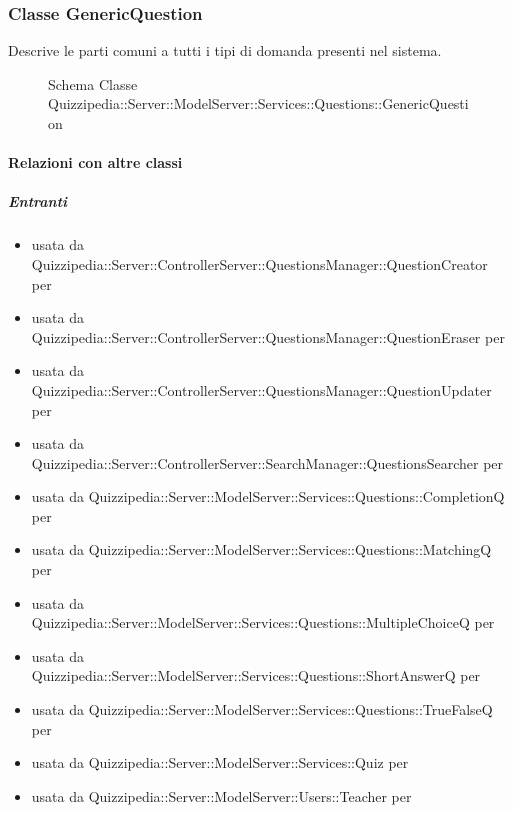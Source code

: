 \subsubsection{Classe GenericQuestion}
Descrive le parti comuni a tutti i tipi di domanda presenti nel sistema.
\begin{figure}[H]
\centering
\noindent{}
\caption[Schema Classe GenericQuestion]{Schema Classe Quizzipedia::Server::ModelServer::Services::Questions::GenericQuestion}
\end{figure}
\paragraph{Relazioni con altre classi}
\subparagraph{Entranti}
\begin{itemize}
\item usata da Quizzipedia::Server::ControllerServer::QuestionsManager::QuestionCreator per 
\item usata da Quizzipedia::Server::ControllerServer::QuestionsManager::QuestionEraser per 
\item usata da Quizzipedia::Server::ControllerServer::QuestionsManager::QuestionUpdater per 
\item usata da Quizzipedia::Server::ControllerServer::SearchManager::QuestionsSearcher per 
\item usata da Quizzipedia::Server::ModelServer::Services::Questions::CompletionQ per 
\item usata da Quizzipedia::Server::ModelServer::Services::Questions::MatchingQ per 
\item usata da Quizzipedia::Server::ModelServer::Services::Questions::MultipleChoiceQ per 
\item usata da Quizzipedia::Server::ModelServer::Services::Questions::ShortAnswerQ per 
\item usata da Quizzipedia::Server::ModelServer::Services::Questions::TrueFalseQ per 
\item usata da Quizzipedia::Server::ModelServer::Services::Quiz per 
\item usata da Quizzipedia::Server::ModelServer::Users::Teacher per 
\end{itemize}
